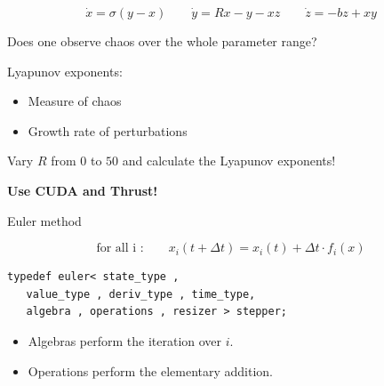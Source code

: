 \begin{frame}[fragile]
 


 $$
  \dot{x} = \sigma ( y - x ) \quad \quad \dot{y} = R x - y - x z \quad \quad \dot{z} = -b z + x y
 $$


Does one observe chaos over the whole parameter range?

\vspace{2ex}

Lyapunov exponents:
\begin{itemize}
 \item Measure of chaos
 \item Growth rate of perturbations
\end{itemize}

\vspace{2ex}
Vary $R$ from $0$ to $50$ and calculate the Lyapunov exponents!

\vspace{2ex}
\centerline{\bf Use CUDA and Thrust!}

\end{frame}


\begin{frame}[fragile]


 \vspace{2ex}

Euler method

$$\text{for all i :}  \quad \quad x_i(t+\Delta t) = x_i(t) + \Delta t \cdot f_i(x)$$

\vspace{2ex}

\begin{lstlisting}
typedef euler< state_type ,
   value_type , deriv_type , time_type,
   algebra , operations , resizer > stepper; 
\end{lstlisting}


\begin{itemize}
\item Algebras perform the iteration over $i$.
\item Operations perform the elementary addition.
\end{itemize}


\end{frame}

